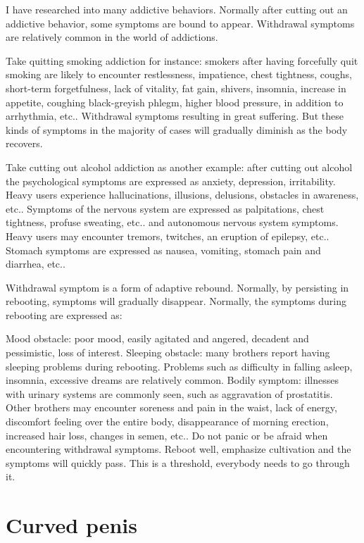 \documentclass[
]{book}
\begin{document}
I have researched into many addictive behaviors. Normally after cutting out an addictive behavior, some symptoms are bound to appear. Withdrawal symptoms are relatively common in the world of addictions.

Take quitting smoking addiction for instance: smokers after having forcefully quit smoking are likely to encounter restlessness, impatience, chest tightness, coughs, short-term forgetfulness, lack of vitality, fat gain, shivers, insomnia, increase in appetite, coughing black-greyish phlegm, higher blood pressure, in addition to arrhythmia, etc.. Withdrawal symptoms resulting in great suffering. But these kinds of symptoms in the majority of cases will gradually diminish as the body recovers.

Take cutting out alcohol addiction as another example: after cutting out alcohol the psychological symptoms are expressed as anxiety, depression, irritability. Heavy users experience hallucinations, illusions, delusions, obstacles in awareness, etc.. Symptoms of the nervous system are expressed as palpitations, chest tightness, profuse sweating, etc.. and autonomous nervous system symptoms. Heavy users may encounter tremors, twitches, an eruption of epilepsy, etc.. Stomach symptoms are expressed as nausea, vomiting, stomach pain and diarrhea, etc..

Withdrawal symptom is a form of adaptive rebound. Normally, by persisting in rebooting, symptoms will gradually disappear. Normally, the symptoms during rebooting are expressed as:

Mood obstacle: poor mood, easily agitated and angered, decadent and pessimistic, loss of interest.
Sleeping obstacle: many brothers report having sleeping problems during rebooting. Problems such as difficulty in falling asleep, insomnia, excessive dreams are relatively common.
Bodily symptom: illnesses with urinary systems are commonly seen, such as aggravation of prostatitis.
Other brothers may encounter soreness and pain in the waist, lack of energy, discomfort feeling over the entire body, disappearance of morning erection, increased hair loss, changes in semen, etc..
Do not panic or be afraid when encountering withdrawal symptoms. Reboot well, emphasize cultivation and the symptoms will quickly pass. This is a threshold, everybody needs to go through it.

\hypertarget{curved-penis}{%
\section{Curved penis}\label{curved-penis}}
\end{document}
